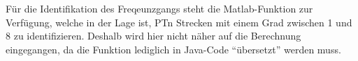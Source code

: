 
F\"ur  die   Identifikation  des   Freqeunzgangs  steht   die  Matlab-Funktion
 zur  Verf\"ugung, welche in  der Lage ist, PTn  Strecken mit
einem Grad zwischen 1 und 8 zu identifizieren. Deshalb wird hier nicht n\"aher
auf  die  Berechnung  eingegangen,  da die  Funktion  lediglich  in  Java-Code
``\"ubersetzt'' werden muss.
